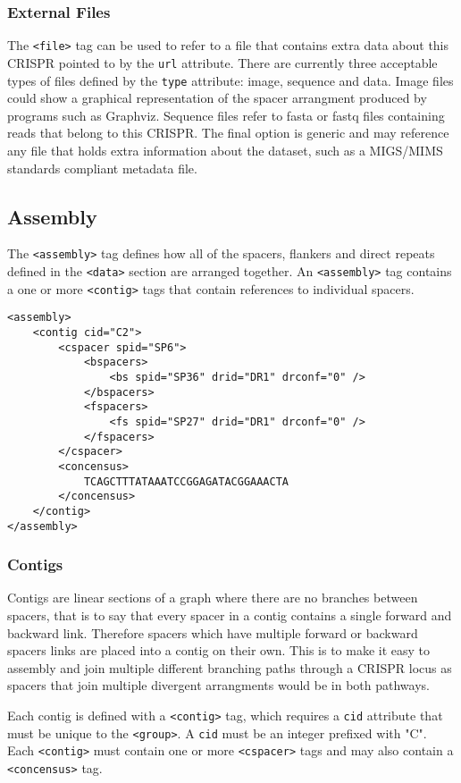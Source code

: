 \documentclass[11pt]{article} %
\begin{document}
\subsubsection{External Files}
The \lstinline[language=XML_new]$<file>$ tag can be used to refer to a file that contains extra data about this CRISPR pointed to by the \lstinline[language=XML_new]$url$ attribute.  There are currently three acceptable types of files defined by the \lstinline[language=XML_new]$type$ attribute: image, sequence and data.  Image files could show a graphical representation of the spacer arrangment produced by programs such as Graphviz.  Sequence files refer to fasta or fastq files containing reads that belong to this CRISPR. The final option is generic and may reference any file that holds extra information about the dataset, such as a MIGS/MIMS standards compliant metadata file. 
\subsection{Assembly}
The \lstinline[language=XML_new]$<assembly>$ tag defines how all of the spacers, flankers and direct repeats defined in the \lstinline[language=XML_new]$<data>$ section are arranged together.  An \lstinline[language=XML_new]$<assembly>$ tag contains a one or more \lstinline[language=XML_new]$<contig>$ tags that contain references to individual spacers.  
\begin{lstlisting}[language=XML_new]
<assembly>
	<contig cid="C2">
		<cspacer spid="SP6">
			<bspacers>
				<bs spid="SP36" drid="DR1" drconf="0" />
			</bspacers>
			<fspacers>
				<fs spid="SP27" drid="DR1" drconf="0" />
			</fspacers>
		</cspacer>
		<concensus>
			TCAGCTTTATAAATCCGGAGATACGGAAACTA
		</concensus>
	</contig>
</assembly>
\end{lstlisting}
\subsubsection{Contigs}
Contigs are linear sections of a graph where there are no branches between spacers, that is to say that every spacer in a contig contains a single forward and backward link.  Therefore spacers which have multiple forward or backward spacers links are placed into a contig on their own.  This is to make it easy to assembly and join multiple different branching paths through a CRISPR locus as spacers that join multiple divergent arrangments would be in both pathways.

Each contig is defined with a \lstinline[language=XML_new]$<contig>$ tag, which requires a  \lstinline[language=XML_new]$cid$ attribute that must be unique to the \lstinline[language=XML_new]$<group>$.  A \lstinline[language=XML_new]$cid$ must be an integer prefixed with "C".  Each \lstinline[language=XML_new]$<contig>$ must contain one or more \lstinline[language=XML_new]$<cspacer>$ tags and may also contain a \lstinline[language=XML_new]$<concensus>$ tag.
\end{document}
